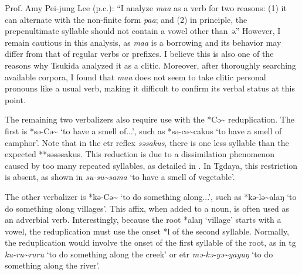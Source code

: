 Prof. Amy Pei-jung Lee (p.c.): ``I analyze \textit{maa} as a verb for two reasons: (1) it can alternate with the non-finite form \textit{paa}; and (2) in principle, the prepenultimate syllable should not contain a vowel other than \textit{ə}.'' However, I remain cautious in this analysis, as \textit{maa} is a borrowing and its behavior may differ from that of regular verbs or prefixes. I believe this is also one of the reasons why Tsukida analyzed it as a clitic. Moreover, after thoroughly searching available corpora, I found that \textit{maa} does not seem to take clitic personal pronouns like a usual verb, making it difficult to confirm its verbal status at this point.


The remaining two verbalizers also require use with the *Cə\~{} reduplication. The first is *sə-Cə\~{} `to have a smell of...', such as *sə-cə\~{}cakus `to have a smell of camphor'. Note that in the \acl{etr} reflex \textit{səsakus}, there is one less syllable than the expected **səsəsakus. This reduction is due to a dissimilation phenomenon caused by too many repeated syllables, as detailed in \textcite[4]{lee2009odor}. In Tgdaya, this restriction is absent, as shown in \textit{su-su\~{}sama} `to have a smell of vegetable'.


The other verbalizer is *kə-Cə\~{} `to do something along...', such as *kə-lə\~{}alaŋ `to do something along villages'. This affix, when added to a noun, is often used as an adverbial verb. Interestingly, because the root *alaŋ `village' starts with a vowel, the reduplication must use the onset *l of the second syllable. Normally, the reduplication would involve the onset of the first syllable of the root, as in \acl{tg} \textit{ku-ru\~{}ruru} `to do something along the creek' or \acl{etr} \textit{mə-kə-yə\~{}yayuŋ} `to do something along the river'.

